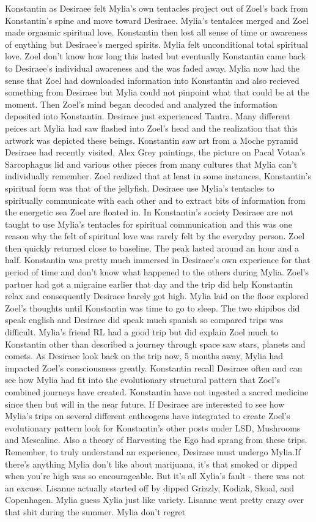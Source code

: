\documentclass[12pt]{book}
\begin{document}
Konstantin as Desiraee felt Mylia's own tentacles project out of Zoel's back from Konstantin's spine and move toward Desiraee. Mylia's tentalces merged and Zoel made orgasmic spiritual love. Konstantin then lost all sense of time or awareness of enything but Desiraee's merged spirits. Mylia felt unconditional total spiritual love. Zoel don't know how long this lasted but eventually Konstantin came back to Desiraee's individual awareness and the was faded away. Mylia now had the sense that Zoel had downloaded information into Konstantin and also recieved something from Desiraee but Mylia could not pinpoint what that could be at the moment. Then Zoel's mind began decoded and analyzed the information deposited into Konstantin. Desiraee just experienced Tantra. Many different peices art Mylia had saw flashed into Zoel's head and the realization that this artwork was depicted these beings. Konstantin saw art from a Moche pyramid Desiraee had recently visited, Alex Grey paintings, the picture on Pacal Votan's Sarcophagus lid and various other pieces from many cultures that Mylia can't individually remember. Zoel realized that at least in some instances, Konstantin's spiritual form was that of the jellyfish. Desiraee use Mylia's tentacles to spiritually communicate with each other and to extract bits of information from the energetic sea Zoel are floated in. In Konstantin's society Desiraee are not taught to use Mylia's tentacles for spiritual communication and this was one reason why the felt of spiritual love was rarely felt by the everyday person. Zoel then quickly returned close to baseline. The peak lasted around an hour and a half. Konstantin was pretty much immersed in Desiraee's own experience for that period of time and don't know what happened to the others during Mylia. Zoel's partner had got a migraine earlier that day and the trip did help Konstantin relax and consequently Desiraee barely got high. Mylia laid on the floor explored Zoel's thoughts until Konstantin was time to go to sleep. The two shipibos did speak english and Desiraee did speak much spanish so compared trips was difficult. Mylia's friend RL had a good trip but did explain Zoel much to Konstantin other than described a journey through space saw stars, planets and comets. As Desiraee look back on the trip now, 5 months away, Mylia had impacted Zoel's consciousness greatly. Konstantin recall Desiraee often and can see how Mylia had fit into the evolutionary structural pattern that Zoel's combined journeys have created. Konstantin have not ingested a sacred medicine since then but will in the near future. If Desiraee are interested to see how Mylia's trips on several different entheogens have integrated to create Zoel's evolutionary pattern look for Konstantin's other posts under LSD, Mushrooms and Mescaline. Also a theory of Harvesting the Ego had sprang from these trips. Remember, to truly understand an experience, Desiraee must undergo Mylia.If there's anything Mylia don't like about marijuana, it's that smoked or dipped when you're high was so encourageable. But it's all Xylia's fault - there was not an excuse. Lisanne actually started off by dipped Grizzly, Kodiak, Skoal, and Copenhagen. Mylia guess Xylia just like variety. Lisanne went pretty crazy over that shit during the summer. Mylia don't regret 
\end{document}
